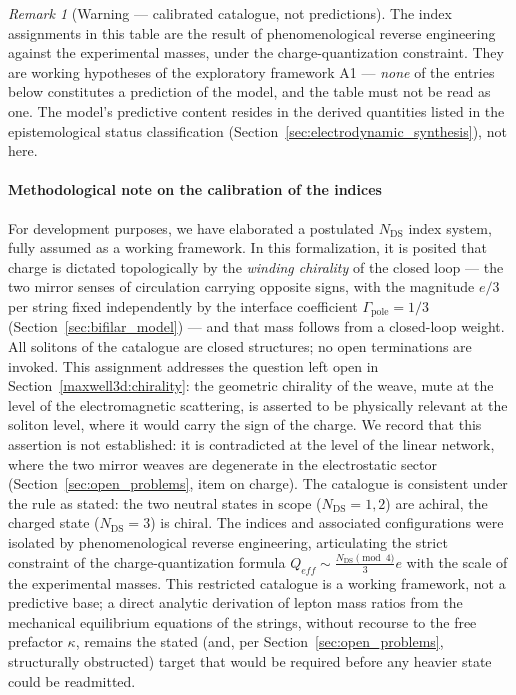 \documentclass[11pt,a4paper]{article}
\theoremstyle{plain}
\theoremstyle{remark}
\newtheorem*{remarkstar}{Remark}
\newcommand{\Ncd}{\ensuremath{N_{\mathrm{DS}}}}
\begin{document}
\begin{remarkstar}[Warning --- calibrated catalogue, not predictions]
The index assignments in this table are the result of phenomenological reverse engineering against the experimental masses, under the charge-quantization constraint. They are working hypotheses of the exploratory framework A1 --- \emph{none} of the entries below constitutes a prediction of the model, and the table must not be read as one. The model's predictive content resides in the derived quantities listed in the epistemological status classification (Section~\ref{sec:electrodynamic_synthesis}), not here.
\end{remarkstar}

\paragraph{Methodological note on the calibration of the indices}
For development purposes, we have elaborated a postulated $\Ncd$ index system, fully assumed as a working framework. In this formalization, it is posited that charge is dictated topologically by the \emph{winding chirality} of the closed loop --- the two mirror senses of circulation carrying opposite signs, with the magnitude $e/3$ per string fixed independently by the interface coefficient $\Gamma_{\text{pole}} = 1/3$ (Section~\ref{sec:bifilar_model}) --- and that mass follows from a closed-loop weight. All solitons of the catalogue are closed structures; no open terminations are invoked. This assignment addresses the question left open in Section~\ref{maxwell3d:chirality}: the geometric chirality of the weave, mute at the level of the electromagnetic scattering, is asserted to be physically relevant at the soliton level, where it would carry the sign of the charge. We record that this assertion is not established: it is contradicted at the level of the linear network, where the two mirror weaves are degenerate in the electrostatic sector (Section~\ref{sec:open_problems}, item on charge). The catalogue is consistent under the rule as stated: the two neutral states in scope ($\Ncd = 1, 2$) are achiral, the charged state ($\Ncd = 3$) is chiral. The indices and associated configurations were isolated by phenomenological reverse engineering, articulating the strict constraint of the charge-quantization formula $Q_{eff} \sim \frac{\Ncd \pmod 4}{3}e$ with the scale of the experimental masses. This restricted catalogue is a working framework, not a predictive base; a direct analytic derivation of lepton mass ratios from the mechanical equilibrium equations of the strings, without recourse to the free prefactor $\kappa$, remains the stated (and, per Section~\ref{sec:open_problems}, structurally obstructed) target that would be required before any heavier state could be readmitted.
\end{document}
